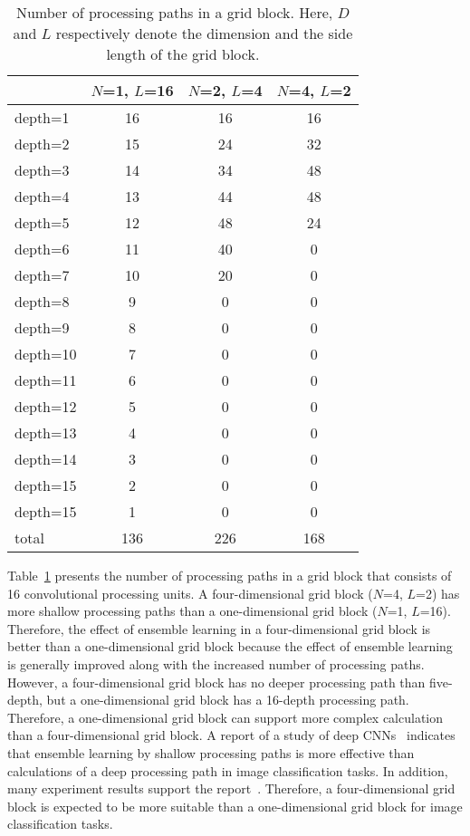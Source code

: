 \documentclass[10pt,twocolumn,letterpaper]{article}
\begin{document}
\begin{table}[t]
\centering
 \caption{Number of processing paths in a grid block.
 Here, $D$ and $L $ respectively denote the dimension and the side length of the grid block.}
 \label{table:path}
 \begin{tabular}{|l|c|c|c|}
  \hline
  & $N$=1, $L$=16 & $N$=2, $L$=4 & $N$=4, $L$=2 \\
  \hline
  depth=1 & 16 & 16 & 16 \\
  depth=2 & 15 & 24 & 32 \\
  depth=3 & 14 & 34 & 48 \\
  depth=4 & 13 & 44 & 48 \\
  depth=5 & 12 & 48 & 24 \\
  depth=6 & 11 & 40 & 0 \\
  depth=7 & 10 & 20 & 0 \\
  depth=8 & 9 & 0 & 0 \\
  depth=9 & 8 & 0 & 0 \\
  depth=10 & 7 & 0 & 0 \\
  depth=11 & 6 & 0 & 0 \\
  depth=12 & 5 & 0 & 0 \\
  depth=13 & 4 & 0 & 0 \\
  depth=14 & 3 & 0 & 0 \\
  depth=15 & 2 & 0 & 0 \\
  depth=15 & 1 & 0 & 0 \\
  \hline
  total & 136 & 226 & 168 \\
  \hline
 \end{tabular}
\end{table}

Table~\ref{table:path} presents the number of processing paths in a grid block that consists of 16 convolutional processing units.
A four-dimensional grid block ($N$=4, $L$=2) has more shallow processing paths than a one-dimensional grid block ($N$=1, $L$=16).
Therefore, the effect of ensemble learning in a four-dimensional grid block is better than a one-dimensional grid block
because the effect of ensemble learning is generally improved along with the increased number of processing paths.
However, a four-dimensional grid block has no deeper processing path than five-depth, but a one-dimensional grid block has a 16-depth processing path.
Therefore, a one-dimensional grid block can support more complex calculation than a four-dimensional grid block.
A report of a study of deep CNNs~\cite{ResNetBehave} indicates that ensemble learning by shallow processing paths is more effective than calculations of a deep processing path in image classification tasks.
In addition, many experiment results support the report~\cite{WideResNet}.
Therefore, a four-dimensional grid block is expected to be more suitable than a one-dimensional grid block for image classification tasks.
\end{document}
